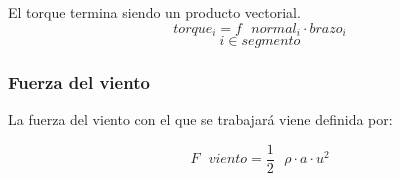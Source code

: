   \begin{definicion}
  El torque termina siendo un producto vectorial.
 $$ torque_i = f \text{ } normal_i \cdot brazo_i$$
 $$ i \in segmento$$
 \label{def:torquevectorial}
 \end{definicion}
 
 
 \subsubsection{Fuerza del viento}
 
 \begin{definicion}
 La fuerza del viento con el que se trabajará viene definida por:
 
 $$ F \text{ } viento = \dfrac{1}{2} \text{ } \rho \cdot a \cdot u^2$$
 \label{def:fuerza_viento}
 \end{definicion}